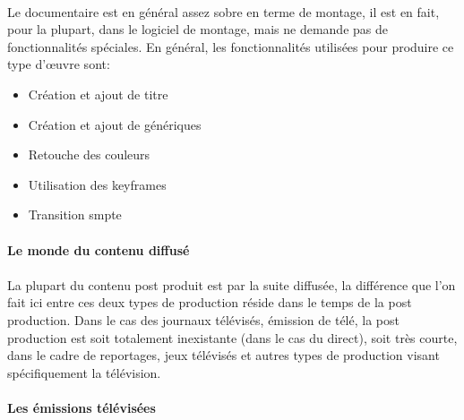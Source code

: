 \paragraph{} Le documentaire est en général assez sobre en terme de
montage, il est en fait, pour la plupart, dans le logiciel de montage,
mais ne demande pas de fonctionnalités spéciales. En général,
les fonctionnalités utilisées pour produire ce type d'œuvre sont:
\begin{itemize} \setlength{\itemsep}{2mm}
  \item{Création et ajout de titre} \item{Création et ajout de
  génériques} \item{Retouche des couleurs} \item{Utilisation
  des keyframes} \item{Transition smpte }
\end{itemize}

\paragraph{Le monde du contenu diffusé}

\paragraph{}

La plupart du contenu post produit est par la suite diffusée,
la différence que l'on fait ici entre ces deux types de production
réside dans le temps de la post production.  Dans le cas des journaux
télévisés, émission de télé, la post production est soit totalement
inexistante (dans le cas du direct), soit très courte, dans le cadre
de reportages, jeux télévisés et autres types de production visant
spécifiquement la télévision.

\paragraph {Les émissions télévisées}

\paragraph{}


